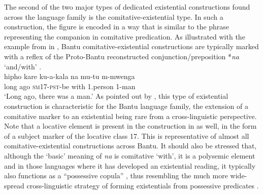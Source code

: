 \documentclass[output=paper]{langscibook}
\begin{document}
The second of the two major types of dedicated existential constructions found across the language family is the comitative-existential type. In such a construction, the figure is encoded in a way that is similar to the phrase representing the companion in comitative predication. As illustrated with the example from  in , Bantu comitative-existential constructions are typically marked with a reflex of the Proto-Bantu reconstructed conjunction/preposition *\textit{na} `and/with' \citep{BastinCoupez2002}.
\ea\label{ex:digo-man}
\\
\gll hipho kare ku-a-kala na mu-tu m-mwenga\\
  long ago \textsc{sm17-pst}-be with 1.person 1-man\\
\glt `Long ago, there was a man.'
\z
As pointed out by \citet{Creissels2014}, this type of existential
construction is characteristic for the Bantu language family, the extension
of a comitative marker to an existential being rare from a cross-linguistic
perspective. Note that a locative element is present in the construction in
 as well, in the form of a subject marker of the locative
class 17. This is representative of almost all comitative-existential constructions across Bantu. It should also be stressed that, although the `basic' meaning of \textit{na} is comitative `with', it is a polysemic element and in those languages where it has developed an existential reading, it typically also functions as a ``possessive copula'' \citep{Marten2013,GibsonGuerois2018}, thus resembling the much more wide-spread cross-linguistic strategy of forming existentials from possessive predicates \citep{Creissels2013}.
\end{document}
